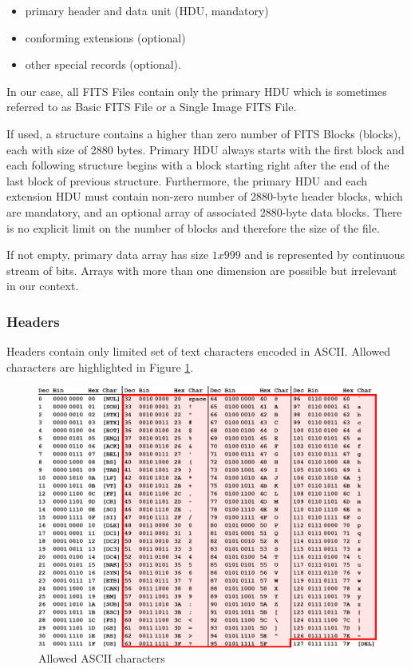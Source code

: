 	\begin{itemize}
		\item primary header and data unit (HDU, mandatory)
		\item conforming extensions (optional)
		\item other special records (optional).
	\end{itemize}
	
	In our case, all FITS Files contain only the primary HDU which is sometimes referred to as Basic FITS File or a Single Image FITS File.
	
	If used, a structure contains a higher than zero number of FITS Blocks (blocks), each with size of 2880 bytes. Primary HDU always starts with the first block and each following structure begins with a block starting right after the end of the last block of previous structure. Furthermore, the primary HDU and each extension HDU must contain non-zero number of 2880-byte header blocks, which are mandatory, and an optional array of associated 2880-byte data blocks. There is no explicit limit on the number of blocks and therefore the size of the file. 
	
	If not empty, primary data array has size $1 x 999$ and is represented by continuous stream of bits. Arrays with more than one dimension are possible but irrelevant in our context.
	
\subsubsection{Headers}

	Headers contain only limited set of text characters encoded in ASCII. Allowed characters are highlighted in Figure \ref{fig:allowed_ascii}.
	
	\begin{figure}[H]
	  \includegraphics[width=\linewidth]{images/asciifull}
		  \caption{Allowed ASCII characters}
	  \label{fig:allowed_ascii}
	\end{figure}
	
